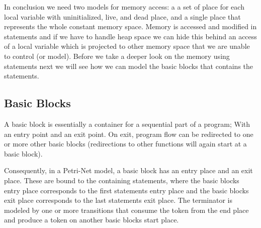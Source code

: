 In conclusion we need two models for memory access: a a set of place for each local variable with uninitialized, live, and dead place, and a single place that represents the whole constant memory space.
Memory is accessed and modified in statements and if we have to handle heap space we can hide this behind an access of a local variable which is projected to other memory space that we are unable to control (or model).
Before we take a deeper look on the memory using statements next we will see how we can model the basic blocks that contains the statements.

\subsection{Basic Blocks}
A basic block is essentially a container for a sequential part of a program; 
With an entry point and an exit point.
On exit, program flow can be redirected to one or more other basic blocks (redirections to other functions will again start at a basic block).

Consequently, in a Petri-Net model, a basic block has an entry place and an exit place.
These are bound to the containing statements, where the basic blocks entry place corresponds to the first statements entry place and the basic blocks exit place corresponds to the last statements exit place.
The terminator is modeled by one or more transitions that consume the token from the end place and produce a token on another basic blocks start place.

